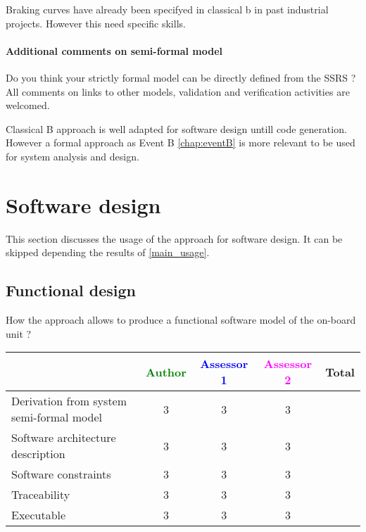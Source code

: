 \begin{author_comment}
Braking curves have already been specifyed in classical b  in past industrial projects. However this need specific skills.
\end{author_comment}


\paragraph{Additional comments on semi-formal  model} Do you think your strictly formal  model can be directly defined from the SSRS ?
All comments on links to  other models, validation and verification activities are welcomed.



\begin{author_comment}
Classical B  approach is well adapted for software design untill code generation. However a formal approach as Event B \ref{chap:eventB} is more relevant to be used for system analysis and design.
\end{author_comment}


\section{Software design}
This section discusses the usage of the approach for software design.
It can be skipped depending the results of \ref{main_usage}.

\subsection{Functional design}

How the approach allows to  produce a functional software model of the on-board unit ?

\begin{tabular}{|l | c | c | c | c|}
\hline
& \textcolor{green}{Author} & \textcolor{blue}{Assessor 1} & \textcolor{magenta}{Assessor 2} & Total \\
\hline
Derivation from system semi-formal model  & 3 & 3 & 3 &  \\
\hline 
Software architecture description  & 3 & 3 & 3 &  \\
\hline
Software constraints  & 3 & 3 & 3 &  \\
\hline
Traceability  & 3 & 3 & 3 &  \\
\hline
Executable  & 3  & 3 & 3 &  \\
\hline
\end{tabular}


